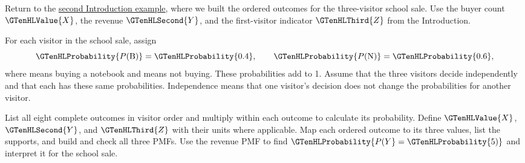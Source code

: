 Return to the \hyperref[subsec:t2-c1-independent-outcomes]{second Introduction example}, where we built the ordered outcomes for the three-visitor school sale. Use the buyer count $\GTenHLValue{X}$, the revenue $\GTenHLSecond{Y}$, and the first-visitor indicator $\GTenHLThird{Z}$ from the Introduction.

For each visitor in the school sale, assign
\[
\GTenHLProbability{P(\mathrm{B})}=\GTenHLProbability{0.4},\qquad \GTenHLProbability{P(\mathrm{N})}=\GTenHLProbability{0.6},
\]
where  means buying a notebook and  means not buying. These probabilities add to 1. Assume that the three visitors decide independently and that each has these same probabilities. Independence means that one visitor's decision does not change the probabilities for another visitor.

    {List all eight complete outcomes in visitor order and multiply within each outcome to calculate its probability.}
    {Define $\GTenHLValue{X}$, $\GTenHLSecond{Y}$, and $\GTenHLThird{Z}$ with their units where applicable. Map each ordered outcome to its three values, list the supports, and build and check all three PMFs.}
    {Use the revenue PMF to find $\GTenHLProbability{P(Y}=\GTenHLProbability{5)}$ and interpret it for the school sale.}

